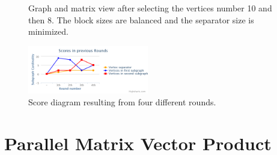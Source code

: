 \documentclass[12pt, oneside]{book}
\begin{document}
\begin{figure}
\centering
{}%
\caption{Graph and matrix view after selecting the vertices number 10 and then 8. The block sizes are balanced and the separator size is minimized.}
\label{selected810}
\end{figure}

\begin{figure}
\centering
\includegraphics[width=0.47\textwidth]{diagram}
\caption{Score diagram resulting from four different rounds.}
\label{diagram}
\end{figure}
\section{Parallel Matrix Vector Product}
\cite{2015:3}
\end{document}
